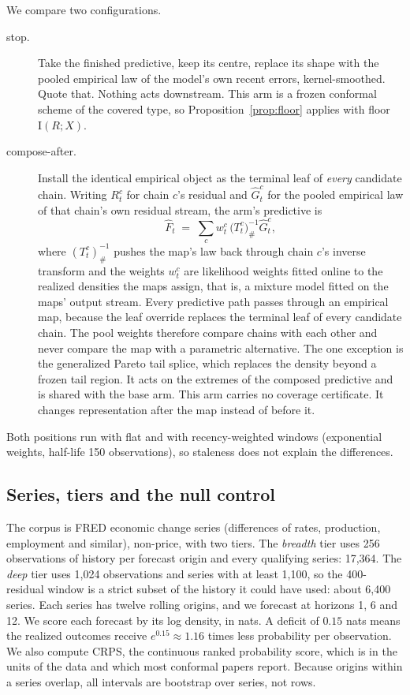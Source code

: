 \documentclass[11pt]{article}
\theoremstyle{remark}
\newcommand{\I}{\mathrm{I}}
\begin{document}
We compare two configurations.

\begin{description}
\item[stop.] Take the finished predictive, keep its centre, replace its shape
  with the pooled empirical law of the model's own recent errors,
  kernel-smoothed. Quote that. Nothing acts downstream. This arm is a frozen
  conformal scheme of the covered type, so Proposition~\ref{prop:floor}
  applies with floor $\I(R;X)$.
\item[compose-after.] Install the identical empirical object as the terminal
  leaf of \emph{every} candidate chain. Writing $R^c_t$ for chain $c$'s
  residual and $\widehat G^c_t$ for the pooled empirical law of that chain's
  own residual stream, the arm's predictive is
  \[
  \widehat F_t \;=\; \sum_c w^c_t \,\big(T^c_t\big)^{-1}_{\#}\widehat G^c_t,
  \]
  where $(T^c_t)^{-1}_{\#}$ pushes the map's law back through chain $c$'s
  inverse transform and the weights $w^c_t$ are likelihood weights fitted
  online to the realized densities the maps assign, that is, a mixture model
  fitted on the maps' output stream. Every predictive path passes through an
  empirical map, because the leaf override replaces the terminal leaf of every
  candidate chain. The pool weights therefore compare chains with each other and
  never compare the map with a parametric alternative. The one exception is the generalized Pareto tail
  splice, which replaces the density beyond a frozen tail region. It acts on
  the extremes of the composed predictive and is shared with the base arm.
  This arm carries no coverage certificate. It changes representation after
  the map instead of before it.
\end{description}

Both positions run with flat and with recency-weighted windows (exponential
weights, half-life 150 observations), so staleness does not explain the
differences.

\subsection{Series, tiers and the null control}\label{sec:design}

The corpus is FRED economic change series (differences of rates, production,
employment and similar), non-price, with two tiers. The \emph{breadth} tier
uses 256 observations of history per forecast origin and every qualifying
series: 17{,}364. The \emph{deep} tier uses 1{,}024 observations and series with at
least 1{,}100, so the 400-residual window is a strict subset of the history it
could have used: about 6{,}400 series. Each series has twelve rolling origins,
and we forecast at horizons 1, 6 and 12. We score each forecast by its log density, in nats. A
deficit of $0.15$ nats means the realized outcomes receive $e^{0.15}\approx1.16$
times less probability per observation. We also compute CRPS, the continuous ranked
probability score, which is in the units of the data and which most conformal papers
report. Because origins within a
series overlap, all intervals are bootstrap over series, not rows.
\end{document}
